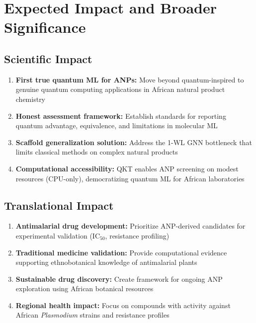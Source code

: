 \documentclass[11pt,a4paper]{article}
\begin{document}
\section{Expected Impact and Broader Significance}

\subsection{Scientific Impact}

\begin{enumerate}
    \item \textbf{First true quantum ML for ANPs:} Move beyond quantum-inspired to genuine quantum computing applications in African natural product chemistry
    
    \item \textbf{Honest assessment framework:} Establish standards for reporting quantum advantage, equivalence, and limitations in molecular ML
    
    \item \textbf{Scaffold generalization solution:} Address the 1-WL GNN bottleneck that limits classical methods on complex natural products
    
    \item \textbf{Computational accessibility:} QKT enables ANP screening on modest resources (CPU-only), democratizing quantum ML for African laboratories
\end{enumerate}

\subsection{Translational Impact}

\begin{enumerate}
    \item \textbf{Antimalarial drug development:} Prioritize ANP-derived candidates for experimental validation (IC$_{50}$, resistance profiling)
    
    \item \textbf{Traditional medicine validation:} Provide computational evidence supporting ethnobotanical knowledge of antimalarial plants
    
    \item \textbf{Sustainable drug discovery:} Create framework for ongoing ANP exploration using African botanical resources
    
    \item \textbf{Regional health impact:} Focus on compounds with activity against African \textit{Plasmodium} strains and resistance profiles
\end{enumerate}
\end{document}
